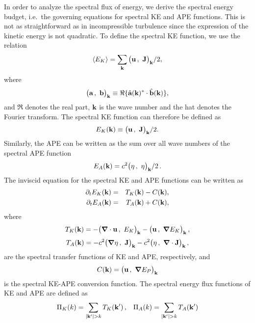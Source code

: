 

In order to analyze the spectral flux of energy, we derive the spectral energy
budget, i.e.\ the governing equations for spectral KE and APE
functions. This is not as straightforward as in incompressible turbulence since
the expression of the kinetic energy  is not
quadratic. To define the spectral KE function, we use the relation
\begin{equation}
\langle  E_K  \rangle = \sum_{\textbf{k}} \big( \textbf{u} \, , \ \textbf{J} \big)_{\textbf{k}}/2,
\end{equation}
where
\begin{equation}
\big( \textbf{a} \, , \ \textbf{b} \big)_{\textbf{k}} \equiv \Re\{ \hat {\textbf{a}}(\textbf{k})^* \cdot \hat {\textbf{b}}(\textbf{k}) \},
\end{equation}
and $\Re$ denotes the real part, $\textbf{k}$ is the wave number and the
hat denotes the Fourier transform.
%
The spectral KE function can therefore be defined as
\begin{equation}
E_K(\textbf{k}) \equiv \big( \textbf{u} \, , \ \textbf{J} \big)_{\textbf{k}}/2.
\end{equation}
Similarly, the APE can be written as the sum over all wave numbers of
the spectral APE function
\begin{equation}
E_A(\textbf{k}) =  c^2 \big( \eta \, , \ \eta \big)_{\textbf{k}}/2 \, .
\end{equation}
The inviscid equation for the spectral KE and APE functions can be written as
\begin{eqnarray}
\partial_t E_K(\textbf{k}) &=& T_K(\textbf{k}) - C (\textbf{k}),\\
\partial_t E_A(\textbf{k}) &=& T_A(\textbf{k}) + C (\textbf{k}),
\end{eqnarray}
where
\begin{equation}
T_K(\textbf{k})
= -\big( \boldsymbol{\nabla} \cdot \textbf{u} \, , \ E_K \big)_{\textbf{k}}
-\big( \textbf{u}  \, , \ \boldsymbol{\nabla} E_K  \big)_{\textbf{k}} \, ,
\end{equation}
\begin{equation}
T_A(\textbf{k}) = -c^2 \big( \boldsymbol{\nabla} \eta  \, , \ \textbf{J} \big)_{\textbf{k}}- c^2\big( \eta \, , \ \boldsymbol{\nabla} \cdot \textbf{J} \big)_{\textbf{k}}  \, ,
\end{equation}
are the spectral transfer functions of KE and APE, respectively, and
\begin{equation}
C (\textbf{k})
= \big( \textbf{u} \, , \ \boldsymbol{\nabla} E_P \big)_{\textbf{k}}
\end{equation}
is the spectral KE-APE conversion function.
The spectral energy flux functions of KE and APE are defined as
\begin{eqnarray}
\Pi_K (k) = \sum_{| {\bf k}^{\prime} | > k} T_K ( {\bf k}^\prime ) \, , \;\;\;  \Pi_A (k) = \sum_{| {\bf k}^{\prime} | > k} T_A ( {\bf k}^\prime )
\end{eqnarray}


